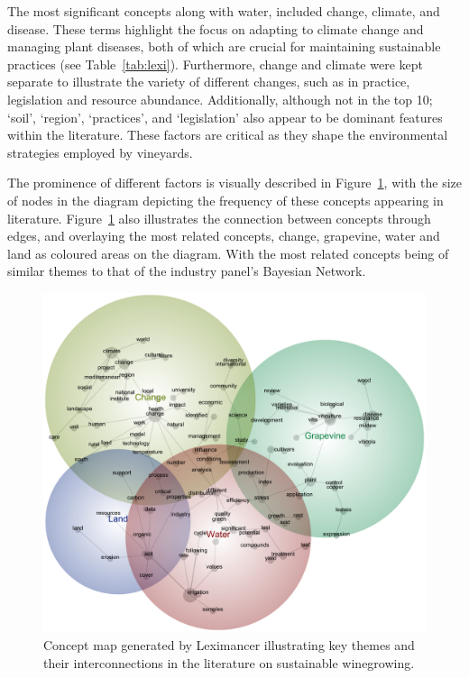 \documentclass[fleqn,10pt]{wlscirep}
\begin{document}
The most significant concepts along with water, included change, climate, and disease. These terms highlight the focus on adapting to climate change and managing plant diseases, both of which are crucial for maintaining sustainable practices (see Table~\ref{tab:lexi}). Furthermore, change and climate were kept separate to illustrate the variety of different changes, such as in practice, legislation and resource abundance. Additionally, although not in the top 10; `soil', `region', `practices', and `legislation' also appear to be dominant features within the literature. These factors are critical as they shape the environmental strategies employed by vineyards.

The prominence of different factors is visually described in Figure~\ref{fig:lexi}, with the size of nodes in the diagram depicting the frequency of these concepts appearing in literature. Figure~\ref{fig:lexi} also illustrates the connection between concepts through edges, and overlaying the most related concepts, change, grapevine, water and land as coloured areas on the diagram. With the most related concepts being of similar themes to that of the industry panel's Bayesian Network.

\begin{figure}[h]
    \centering
    \includegraphics[width=\linewidth]{Winegrowing-concept-map}
    \caption{Concept map generated by Leximancer illustrating key themes and their interconnections in the literature on sustainable winegrowing.}\label{fig:lexi}
\end{figure}
\end{document}
